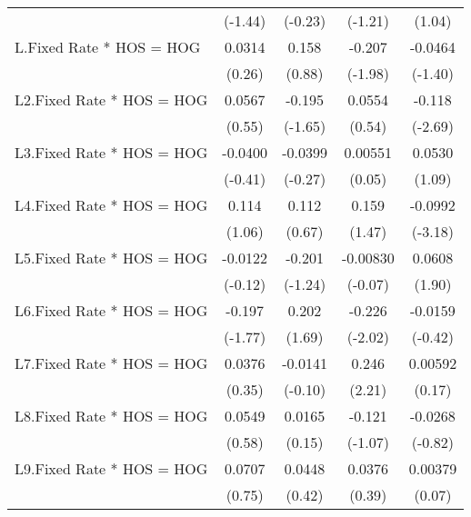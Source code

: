 {\begin{longtable}{l*{4}{c}}
                &  (-1.44)         &  (-0.23)         &  (-1.21)         &   (1.04)         \\
[1em]
L.Fixed Rate * HOS = HOG&   0.0314         &    0.158         &   -0.207\sym{*}  &  -0.0464         \\
                &   (0.26)         &   (0.88)         &  (-1.98)         &  (-1.40)         \\
[1em]
L2.Fixed Rate * HOS = HOG&   0.0567         &   -0.195         &   0.0554         &   -0.118\sym{**} \\
                &   (0.55)         &  (-1.65)         &   (0.54)         &  (-2.69)         \\
[1em]
L3.Fixed Rate * HOS = HOG&  -0.0400         &  -0.0399         &  0.00551         &   0.0530         \\
                &  (-0.41)         &  (-0.27)         &   (0.05)         &   (1.09)         \\
[1em]
L4.Fixed Rate * HOS = HOG&    0.114         &    0.112         &    0.159         &  -0.0992\sym{**} \\
                &   (1.06)         &   (0.67)         &   (1.47)         &  (-3.18)         \\
[1em]
L5.Fixed Rate * HOS = HOG&  -0.0122         &   -0.201         & -0.00830         &   0.0608         \\
                &  (-0.12)         &  (-1.24)         &  (-0.07)         &   (1.90)         \\
[1em]
L6.Fixed Rate * HOS = HOG&   -0.197         &    0.202         &   -0.226\sym{*}  &  -0.0159         \\
                &  (-1.77)         &   (1.69)         &  (-2.02)         &  (-0.42)         \\
[1em]
L7.Fixed Rate * HOS = HOG&   0.0376         &  -0.0141         &    0.246\sym{*}  &  0.00592         \\
                &   (0.35)         &  (-0.10)         &   (2.21)         &   (0.17)         \\
[1em]
L8.Fixed Rate * HOS = HOG&   0.0549         &   0.0165         &   -0.121         &  -0.0268         \\
                &   (0.58)         &   (0.15)         &  (-1.07)         &  (-0.82)         \\
[1em]
L9.Fixed Rate * HOS = HOG&   0.0707         &   0.0448         &   0.0376         &  0.00379         \\
                &   (0.75)         &   (0.42)         &   (0.39)         &   (0.07)         \\

\end{longtable}}
